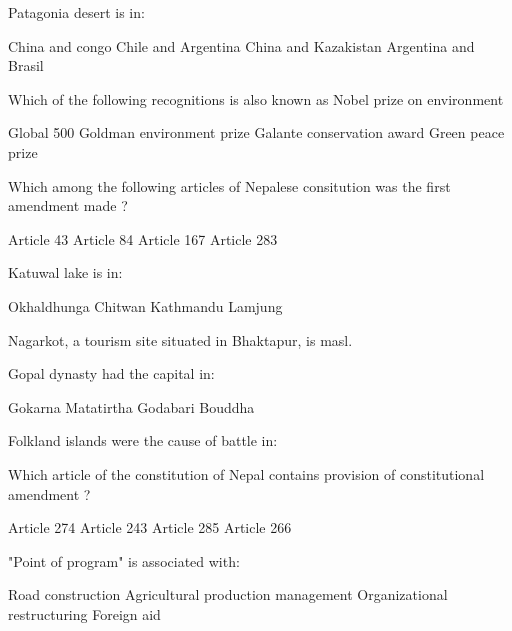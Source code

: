\begin{questions}
\question Patagonia desert is in:
  \begin{choices}
  \choice China and congo
  \choice Chile and Argentina
  \CorrectChoice China and Kazakistan
  \choice Argentina and Brasil
  \end{choices}

\question Which of the following recognitions is also known as Nobel prize on environment
  \begin{choices}
  \choice Global 500
  \CorrectChoice Goldman environment prize
  \choice Galante conservation award
  \choice Green peace prize
  \end{choices}

\question Which among the following articles of Nepalese consitution was the first amendment made ?
  \begin{choices}
  \choice Article 43
  \choice Article 84
  \choice Article 167
  \choice Article 283
  \end{choices}

\question Katuwal lake is in:
  \begin{choices}
  \choice Okhaldhunga
  \choice Chitwan
  \CorrectChoice Kathmandu
  \choice Lamjung
  \end{choices}

\question Nagarkot, a tourism site situated in Bhaktapur, is \fillin[][2cm] masl.
  \begin{choices}
  \end{choices}

\question Gopal dynasty had the capital in:
  \begin{choices}
  \CorrectChoice Gokarna
  \choice Matatirtha
  \choice Godabari
  \choice Bouddha
  \end{choices}

\question Folkland islands were the cause of battle in:
  \begin{choices}
  \end{choices}

\question Which article of the constitution of Nepal contains provision of constitutional amendment ?
  \begin{choices}
  \CorrectChoice Article 274
  \choice Article 243
  \choice Article 285
  \choice Article 266
  \end{choices}

\question "Point of program" is associated with:
  \begin{choices}
  \choice Road construction
  \choice Agricultural production management
  \choice Organizational restructuring
  \CorrectChoice Foreign aid
  \end{choices}


\end{questions}
